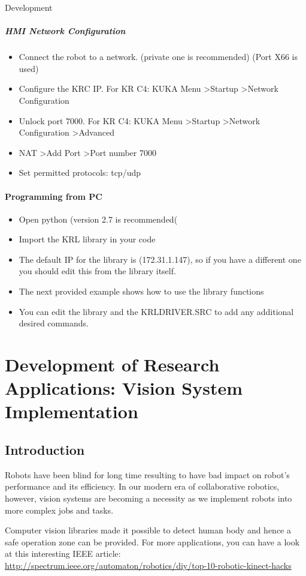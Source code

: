 \documentclass[a4paper]{book}
\begin{document}
\begin{chapter}{Development}
\begin{itemize}
\end{itemize}
\subparagraph{HMI Network Configuration}
\begin{itemize}
	\item Connect the robot to a network. (private one is recommended) (Port X66 is used)
	\item Configure the KRC IP. For KR C4: KUKA Menu \textgreater Startup \textgreater Network Configuration
	\item Unlock port 7000. For KR C4: KUKA Menu \textgreater Startup \textgreater Network Configuration \textgreater Advanced
	\item NAT \textgreater Add Port \textgreater Port number 7000
	\item Set permitted protocols: tcp/udp
	
\end{itemize}
\paragraph{Programming from PC }
\begin{itemize}
	\item Open python (version 2.7 is recommended(
	\item Import the KRL library in your code 
	\item The default IP for the library is (172.31.1.147), so if you have a different one you should edit this from the library itself. 
	\item The next provided example shows how to use the library functions 
	\item You can edit the library and the KRLDRIVER.SRC to add any additional desired commands.
\end{itemize}
\newpage
\section{Development of Research Applications: Vision System Implementation}
\subsection{Introduction}
Robots have been blind for long time resulting to have bad impact on robot's performance and its efficiency. In our modern era of collaborative robotics, however, vision systems are becoming a necessity as we implement robots into more complex jobs and tasks.


Computer vision libraries made it possible to detect human body and hence a safe operation zone can be provided. For more applications, you can have a look at this interesting IEEE article:
\url{http://spectrum.ieee.org/automaton/robotics/diy/top-10-robotic-kinect-hacks} 


\end{chapter}
\end{document}
